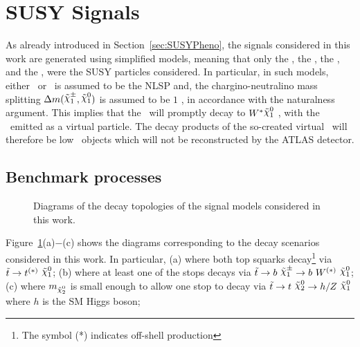 	\section{SUSY Signals}
	\label{sec:susysig}

		As already introduced in Section~\ref{sec:SUSYPheno}, the signals considered in this work are generated using simplified models, meaning that only the \stop, the \ninoone, the \ninotwo, and the \chinoonepm, were the \ac{SUSY} particles considered. In particular, in such models, either \ninotwo\ or \chinoonepm\ is assumed to be the \ac{NLSP} and, the chargino-neutralino mass splitting $\Delta m(\chinoonepm, \ninoone)$ is assumed to be $1$ \GeV, in accordance with the naturalness argument. This implies that the \chinoonepm\ will promptly decay to $\Wboson^*\ninoone$ , with the \Wboson\ emitted as a virtual particle. The decay products of the so-created virtual \Wboson\ will therefore be low \pt\ objects which will not be reconstructed by the \ac{ATLAS} detector. 

		\subsection{Benchmark processes}

			\begin{figure}[!htb]
				\centering
					\hspace{0.05\textwidth}
					\hspace{0.05\textwidth}
					\hspace{0.05\textwidth}
				\caption{Diagrams of the decay topologies of the signal models considered in this work.}
				\label{fig:stopModels}
			\end{figure}

			Figure~\ref{fig:stopModels}(a)$-$(c) shows the diagrams corresponding to the decay scenarios considered in this work. In particular, (a) where both top squarks decay\footnote{The symbol (*) indicates off-shell production} via $\stop\rightarrow t^{(*)}\ \ninoone$; (b) where at least one of the stops decays via $\stop\rightarrow b\ \chinoonepm \rightarrow b\ \Wboson^{(*)}\ \ninoone$; (c) where $m_{\ninotwo}$ is small enough to allow one stop to decay via $\stop\to t\ \ninotwo \to h/Z\ \ninoone$ where $h$ is the \ac{SM} Higgs boson;

